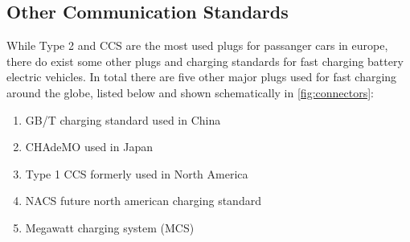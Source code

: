 \documentclass[conference,flushend]{iaria} %
\begin{document}


\subsection{Other Communication Standards}
While Type 2 and CCS are the most used plugs for passanger cars in europe, there do exist some other plugs and charging standards for fast charging battery electric vehicles.
In total there are five other major plugs used for fast charging around the globe, listed below and shown schematically in \ref{fig:connectors}:

\begin{enumerate}
\item GB/T charging standard used in China
\item CHAdeMO used in Japan
\item Type 1 CCS formerly used in North America
\item NACS future north american charging standard
\item Megawatt charging system (MCS)
\end{enumerate}
\end{document}
